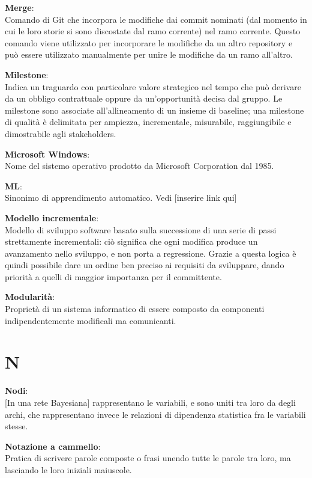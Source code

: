 \documentclass[a4paper, oneside, openany, dvipsnames, table]{article}
\begin{document}
\textbf{Merge}:\\	Comando di Git che incorpora le modifiche dai commit nominati (dal momento in cui le loro storie si sono discostate dal ramo corrente) nel ramo corrente. Questo comando viene utilizzato per incorporare le modifiche da un altro repository e può essere utilizzato manualmente per unire le modifiche da un ramo all'altro.

\textbf{Milestone}:\\Indica un traguardo con particolare valore strategico nel tempo che può derivare da un obbligo contrattuale oppure da un'opportunità decisa dal gruppo. Le milestone sono associate all'allineamento di un insieme di baseline; una milestone di qualità è delimitata per ampiezza, incrementale, misurabile, raggiungibile e dimostrabile agli stakeholders.


\textbf{Microsoft Windows}:\\Nome del sistemo operativo prodotto da Microsoft Corporation dal 1985.

\textbf{ML}:\\Sinonimo di apprendimento automatico. Vedi [inserire link qui]

\textbf{Modello incrementale}:\\Modello di sviluppo software basato sulla successione di una serie di passi strettamente incrementali: ciò significa che ogni modifica produce un avanzamento nello sviluppo, e non porta a regressione. Grazie a questa logica è quindi possibile dare un ordine ben preciso ai requisiti da sviluppare, dando priorità a quelli di maggior importanza per il committente.

\textbf{Modularità}:\\
Proprietà di un sistema informatico di essere composto da componenti indipendentemente modificali ma comunicanti.


\newpage
\section{N}
\textbf{Nodi}:\\ 
{[}In una rete Bayesiana{]} rappresentano le variabili, e sono uniti tra loro da degli archi, che rappresentano invece le relazioni di dipendenza statistica fra le variabili stesse.

\textbf{Notazione a cammello}:\\	Pratica di scrivere parole composte o frasi unendo tutte le parole tra loro, ma lasciando le loro iniziali maiuscole.
\end{document}
